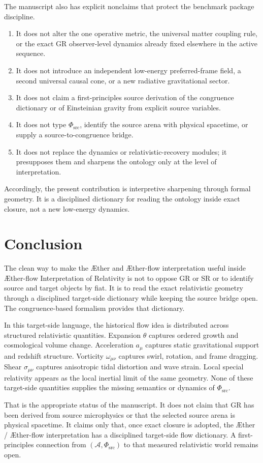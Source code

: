 \documentclass[11pt]{article}
\newcommand{\Aether}{\AE{}ther}
\newcommand{\Aflow}{\AE{}ther-flow}
\newcommand{\TheoryName}{\Aflow{} Interpretation of Relativity}
\newcommand{\Sub}{\mathcal{A}}
\newcommand{\PhiSrc}{\Phi_{\mathrm{src}}}
\begin{document}
The manuscript also has explicit nonclaims that protect the benchmark package discipline.
\begin{enumerate}
    \item It does not alter the one operative metric, the universal matter coupling rule, or the exact GR observer-level dynamics already fixed elsewhere in the active sequence.
    \item It does not introduce an independent low-energy preferred-frame field, a second universal causal cone, or a new radiative gravitational sector.
    \item It does not claim a first-principles source derivation of the congruence dictionary or of Einsteinian gravity from explicit source variables.
    \item It does not type \(\PhiSrc\), identify the source arena with physical spacetime, or supply a source-to-congruence bridge.
    \item It does not replace the dynamics or relativistic-recovery modules; it presupposes them and sharpens the ontology only at the level of interpretation.
\end{enumerate}

Accordingly, the present contribution is interpretive sharpening through formal geometry. It is a disciplined dictionary for reading the ontology inside exact closure, not a new low-energy dynamics.

\section{Conclusion}

The clean way to make the \Aether{} and \Aflow{} interpretation useful inside
\TheoryName{} is not to oppose GR or SR or to identify source and target
objects by fiat. It is to read the exact relativistic geometry through a
disciplined target-side dictionary while keeping the source bridge open. The
congruence-based formalism provides that dictionary.

In this target-side language, the historical flow idea is distributed across
structured relativistic quantities. Expansion \(\theta\) captures ordered
growth and cosmological volume change. Acceleration \(a_\mu\) captures static
gravitational support and redshift structure. Vorticity
\(\omega_{\mu\nu}\) captures swirl, rotation, and frame dragging. Shear
\(\sigma_{\mu\nu}\) captures anisotropic tidal distortion and wave strain.
Local special relativity appears as the local inertial limit of the same
geometry. None of these target-side quantities supplies the missing semantics
or dynamics of \(\PhiSrc\).

That is the appropriate status of the manuscript. It does not claim that GR
has been derived from source microphysics or that the selected source arena is
physical spacetime. It claims only that, once exact closure is adopted, the
\Aether{} / \Aflow{} interpretation has a disciplined target-side flow
dictionary. A first-principles connection from \((\Sub,\PhiSrc)\) to that
measured relativistic world remains open.


\end{document}
